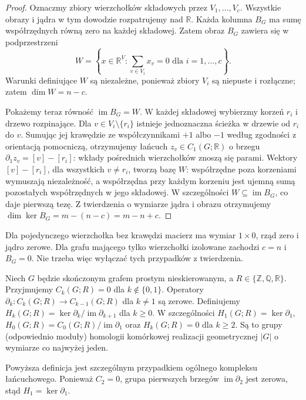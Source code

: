 \begin{proof}
Oznaczmy zbiory wierzchołków składowych przez $V_1,\ldots,V_c$.
Wszystkie obrazy i jądra w tym dowodzie rozpatrujemy nad $\mathbb R$.
Każda kolumna $B_G$ ma sumę współrzędnych równą zero na każdej
składowej. Zatem obraz $B_G$ zawiera się w podprzestrzeni
\[
W=\left\{x\in\mathbb R^V:\sum_{v\in V_i}x_v=0
\text{ dla }i=1,\ldots,c\right\}.
\]
Warunki definiujące $W$ są niezależne, ponieważ zbiory $V_i$ są
niepuste i rozłączne; zatem $\dim W=n-c$.

Pokażemy teraz równość $\operatorname{im}B_G=W$.
W każdej składowej wybierzmy korzeń $r_i$ i drzewo rozpinające.
Dla $v\in V_i\setminus\{r_i\}$ istnieje jednoznaczna ścieżka
w drzewie od $r_i$ do $v$. Sumując jej krawędzie ze współczynnikami
$+1$ albo $-1$ według zgodności z orientacją pomocniczą, otrzymujemy
łańcuch $z_v\in C_1(G;\mathbb R)$ o brzegu
$\partial_1z_v=[v]-[r_i]$: wkłady pośrednich wierzchołków znoszą się
parami. Wektory $[v]-[r_i]$, dla wszystkich $v\ne r_i$, tworzą bazę
$W$: współrzędne poza korzeniami wymuszają niezależność,
a współrzędna przy każdym korzeniu jest ujemną sumą pozostałych
współrzędnych w jego składowej. W szczególności $W\subseteq\operatorname{im}B_G$, co daje
pierwszą tezę. Z twierdzenia o wymiarze jądra i obrazu otrzymujemy
$\dim\ker B_G=m-(n-c)=m-n+c$.
\end{proof}

\begin{uwaga}
Dla pojedynczego wierzchołka bez krawędzi macierz ma wymiar
$1\times0$, rząd zero i jądro zerowe. Dla grafu mającego tylko
wierzchołki izolowane zachodzi $c=n$ i $B_G=0$.
Nie trzeba więc wyłączać tych przypadków z twierdzenia.
\end{uwaga}

\begin{definicja}
Niech $G$ będzie skończonym grafem prostym nieskierowanym,
a $R\in\{\mathbb Z,\mathbb Q,\mathbb R\}$.
Przyjmujemy $C_k(G;R)=0$ dla $k\notin\{0,1\}$.
Operatory $\partial_k:C_k(G;R)\to C_{k-1}(G;R)$ dla
$k\ne1$ są zerowe. Definiujemy
$H_k(G;R)=\ker\partial_k/\operatorname{im}\partial_{k+1}$
dla $k\geq0$. W szczególności $H_1(G;R)=\ker\partial_1$,
$H_0(G;R)=C_0(G;R)/\operatorname{im}\partial_1$
oraz $H_k(G;R)=0$ dla $k\geq2$.
Są to grupy (odpowiednio moduły) homologii komórkowej
realizacji geometrycznej $|G|$ o wymiarze co najwyżej jeden.
\end{definicja}

Powyższa definicja jest szczególnym przypadkiem ogólnego kompleksu
łańcuchowego. Ponieważ $C_2=0$, grupa pierwszych brzegów
$\operatorname{im}\partial_2$ jest zerowa, stąd $H_1=\ker\partial_1$.


